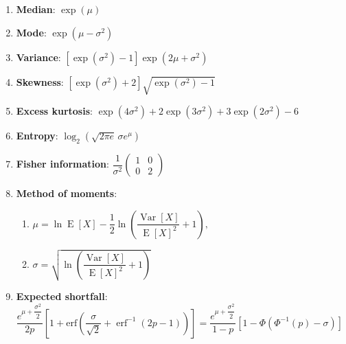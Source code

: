\begin{enumerate}
    \item \textbf{Median}: ${\displaystyle \exp(\mu )}$
    \hfill \cite{wiki/Log-normal_distribution}

    \item \textbf{Mode}: ${\displaystyle \exp \left(\mu -\sigma ^{2}\right)}$
    \hfill \cite{wiki/Log-normal_distribution}

    \item \textbf{Variance}:
    ${\displaystyle \left[\exp(\sigma ^{2})-1\right]\exp \left(2\mu +\sigma ^{2}\right)}$
    \hfill \cite{wiki/Log-normal_distribution}

    \item \textbf{Skewness}:
    ${\displaystyle \left[\exp \left(\sigma ^{2}\right)+2\right]{\sqrt {\exp(\sigma ^{2})-1}}}$
    \hfill \cite{wiki/Log-normal_distribution}

    \item \textbf{Excess kurtosis}:
    ${\displaystyle \exp \left(4\sigma ^{2}\right)+2\exp \left(3\sigma ^{2}\right)+3\exp \left(2\sigma ^{2}\right)-6}$
    \hfill \cite{wiki/Log-normal_distribution}

    \item \textbf{Entropy}: ${\displaystyle \log _{2}\left({\sqrt {2\pi e}}\,\sigma e^{\mu }\right)}$
    \hfill \cite{wiki/Log-normal_distribution}

    \item \textbf{Fisher information}:
    ${\displaystyle {\dfrac {1}{\sigma ^{2}}}{\begin{pmatrix}1&0\\0&2\end{pmatrix}}}$
    \hfill \cite{wiki/Log-normal_distribution}

    \item \textbf{Method of moments}:
    \begin{enumerate}
        \item ${\displaystyle \mu =\ln \operatorname {E} [X]-{\dfrac {1}{2}}\ln \left({\dfrac {\operatorname {Var} [X]}{\operatorname {E} [X]^{2}}}+1\right),}$
        \hfill \cite{wiki/Log-normal_distribution}

        \item ${\displaystyle \sigma ={\sqrt {\ln \left({\dfrac {\operatorname {Var} [X]}{\operatorname {E} [X]^{2}}}+1\right)}}}$
        \hfill \cite{wiki/Log-normal_distribution}
    \end{enumerate}

    \item \textbf{Expected shortfall}:
    $
        {\displaystyle {{\dfrac {e^{\mu +{\dfrac {\sigma ^{2}}{2}}}}{2p}}\left[1+\text{erf} \left({\dfrac {\sigma }{\sqrt {2}}}+\operatorname {erf} ^{-1}(2p-1)\right)\right]
        ={\dfrac {e^{\mu +{\dfrac {\sigma ^{2}}{2}}}}{1-p}}\left[1-\Phi (\Phi ^{-1}(p)-\sigma )\right]}}
    $
    \hfill \cite{wiki/Log-normal_distribution}


\end{enumerate}
